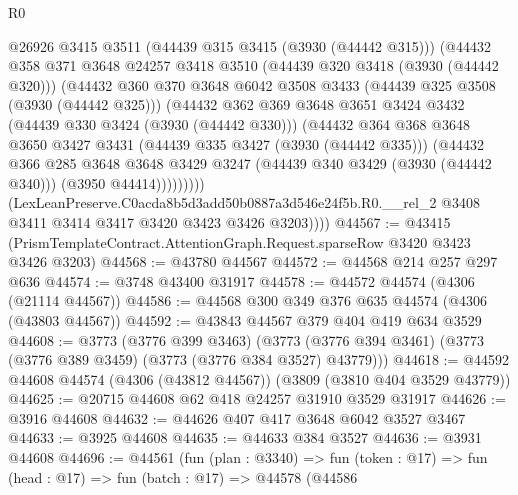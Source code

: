 \begin{lexlean}{R0}
\begin{coremodule}
                @26926
                @3415
                @3511
                (@44439 @315 @3415 (@3930 (@44442 @315)))
                (@44432
                  @358
                  @371
                  @3648
                  @24257
                  @3418
                  @3510
                  (@44439 @320 @3418 (@3930 (@44442 @320)))
                  (@44432
                    @360
                    @370
                    @3648
                    @6042
                    @3508
                    @3433
                    (@44439 @325 @3508 (@3930 (@44442 @325)))
                    (@44432
                      @362
                      @369
                      @3648
                      @3651
                      @3424
                      @3432
                      (@44439 @330 @3424 (@3930 (@44442 @330)))
                      (@44432
                        @364
                        @368
                        @3648
                        @3650
                        @3427
                        @3431
                        (@44439 @335 @3427 (@3930 (@44442 @335)))
                        (@44432
                          @366
                          @285
                          @3648
                          @3648
                          @3429
                          @3247
                          (@44439 @340 @3429 (@3930 (@44442 @340)))
                          (@3950 @44414)))))))))
          (LexLeanPreserve.C0acda8b5d3add50b0887a3d546e24f5b.R0.__rel_2
            @3408
            @3411
            @3414
            @3417
            @3420
            @3423
            @3426
            @3203))))
@44567 := @43415 (PrismTemplateContract.AttentionGraph.Request.sparseRow @3420 @3423 @3426 @3203)
@44568 := @43780 @44567
@44572 := @44568 @214 @257 @297 @636
@44574 := @3748 @43400 @31917
@44578 := @44572 @44574 (@4306 (@21114 @44567))
@44586 := @44568 @300 @349 @376 @635 @44574 (@4306 (@43803 @44567))
@44592 := @43843 @44567 @379 @404 @419 @634 @3529
@44608 := @3773
    (@3776 @399 @3463)
    (@3773 (@3776 @394 @3461) (@3773 (@3776 @389 @3459) (@3773 (@3776 @384 @3527) @43779)))
@44618 := @44592 @44608 @44574 (@4306 (@43812 @44567)) (@3809 (@3810 @404 @3529 @43779))
@44625 := @20715 @44608 @62 @418 @24257 @31910 @3529 @31917
@44626 := @3916 @44608
@44632 := @44626 @407 @417 @3648 @6042 @3527 @3467
@44633 := @3925 @44608
@44635 := @44633 @384 @3527
@44636 := @3931 @44608
@44696 := @44561
    (fun (plan : @3340) =>
    fun (token : @17) =>
    fun (head : @17) =>
    fun (batch : @17) =>
    @44578
      (@44586

\end{coremodule}
\end{lexlean}
